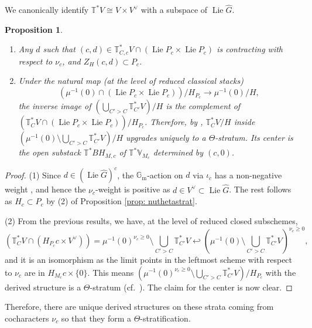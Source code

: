 \documentclass{amsart}
\newtheorem{proposition}[theorem]{Proposition}
\theoremstyle{definition}
\theoremstyle{remark}
\numberwithin{equation}{section}
\DeclareMathOperator{\Lie}{Lie}
\newcommand{\Gm}{{\mathbb{G}_{\mathrm{m}}}}
\newcommand{\wh}{\widehat}
\newcommand{\V}{\mathbb{V}}
\newcommand{\T}{\mathbb{T}}
\begin{document}
We canonically identify $\T^*V\cong V\times V^\vee$ with a subspace of $\Lie \wh{G}$. 

\begin{proposition}{\label{prop: TVthetastrat}}
\begin{enumerate}
    \item Any $d$ such that $(c,d) \in \T_{C, c}^* V \cap (\Lie P_c \times \Lie P_c)$ is contracting with respect to $\nu_c$, and $Z_{H}(c,d)\subset P_c$. 
    \item Under the natural map (at the level of reduced classical stacks) \[(\mu^{-1}(0)\cap (\Lie P_c\times \Lie P_c))/H_{P_c}\to \mu^{-1}(0)/H,\]  the inverse image of $(\bigcup_{C'> C}\T_{C'}^*V)/H$ is the complement of $(\T_{C}^* V\cap (\Lie P_c\times \Lie P_c))/H_{P_c}$. Therefore, by \cite[Lemma 1.2.3]{HalpernLeistner}, $\T_C^* V/H$ inside $(\mu^{-1}(0)\setminus \bigcup_{C'> C}\T_{C'}^*V)/H$ upgrades uniquely to a $\Theta$-stratum. Its center is the open substack $\T^* BH_{M,c}$ of $\T^* \V_{M_c}$ determined by $(c,0)$.  
\end{enumerate}
\end{proposition}

\begin{proof}
(1) Since $d\in (\Lie \wh{G})^c$, the $\Gm$-action on $d$ via $\iota_c$ has a non-negative weight \cite[Lemma 3.4.3]{CollingWoodMcGovern}, and hence the $\nu_c$-weight is positive as $d\in V^\vee\subset \Lie \wh G$. The rest follows as $H_c \subset P_c$ by (2) of Proposition \ref{prop: nuthetastrat}.

(2)  From the previous results, we have, at the level of reduced closed subschemes, 
\[
(\T_C^* V \cap (H_{P_c} c\times V^\vee))=\mu^{-1}(0)^{\nu_c\geq 0}\setminus \bigcup_{C'> C}\T_{C'}^*V
\hookleftarrow 
(\mu^{-1}(0)\setminus \bigcup_{C'> C}\T_{C'}^*V)^{\nu_c\geq 0},
\]
and it is an isomorphism as the limit points in the leftmost scheme with respect to $\nu_c$ are in $H_{M_c} c \times \{0\}$. This means $(\mu^{-1}(0)^{\nu_c\geq 0}\setminus \bigcup_{C'> C}\T_{C'}^*V)/ H_{P_c}$ with the derived structure is a $\Theta$-stratum (cf.~\cite[Lemma 1.2.3]{HalpernLeistner}). The claim for the center is now clear. 
\end{proof}

Therefore, there are unique derived structures on these strata coming from cocharacters $\nu_c$ so that they form a $\Theta$-stratification.
\end{document}
